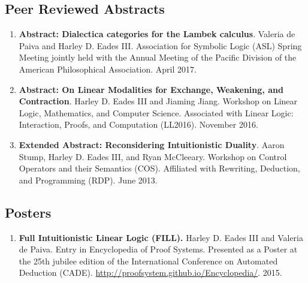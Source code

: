 \documentclass{article}
\begin{document}
  \subsection{Peer Reviewed Abstracts}
  \label{subsec:abstracts}
  \begin{enumerate}
    
  \item \textbf{Abstract: Dialectica categories for the Lambek
    calculus}.  Valeria de Paiva and Harley D. Eades III. Association for
    Symbolic Logic (ASL) Spring Meeting jointly held with the Annual
    Meeting of the Pacific Division of the American Philosophical
    Association.  April 2017.
    
  \item \textbf{Abstract: On Linear Modalities for Exchange,
    Weakening, and Contraction}.  Harley D. Eades III and Jiaming Jiang.
    Workshop on Linear Logic, Mathematics, and Computer
    Science. Associated with Linear Logic: Interaction, Proofs, and
    Computation (LL2016).  November 2016.

  \item \textbf{Extended Abstract: Reconsidering Intuitionistic
    Duality}.  Aaron Stump, Harley D. Eades III, and Ryan
    McCleeary. Workshop on Control Operators and their Semantics
    (COS).  Affiliated with Rewriting, Deduction, and Programming
    (RDP). June 2013.
  \end{enumerate}
  
  \subsection{Posters}
  \label{subsec:posters}
  \begin{enumerate}
  \item \textbf{Full Intuitionistic Linear Logic (FILL).} Harley D. Eades
    III and Valeria de Paiva. Entry in Encyclopedia of Proof
    Systems. Presented as a Poster at the 25th jubilee edition of the
    International Conference on Automated Deduction (CADE). \url{http://proofsystem.github.io/Encyclopedia/}. 2015.
  \end{enumerate}
\end{document}
